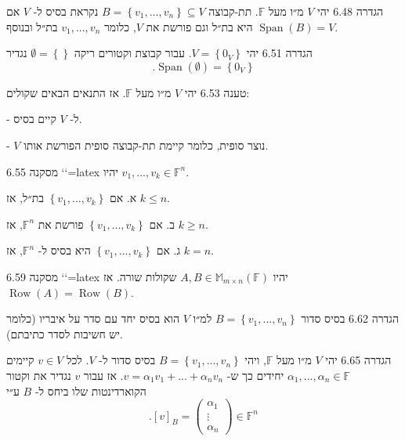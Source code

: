 \documentclass[a4paper, 11pt]{article}
\newcommand{\Set}[1]{\left\{#1\right\}}
\begin{document}
\begin{envbox}[defcolor]{הגדרה 6.48}
יהי $V$ מ״ו מעל $\mathbb{F}$. תת-קבוצה $B=\Set{v_1,...,v_n}\subseteq V$ נקראת בסיס ל- $V$ אם היא בת״ל וגם פורשת את $V$, כלומר $v_1,...,v_n$ בת״ל ובנוסף $\mathop{\mathrm{Span}}(B)=V$.
\end{envbox}

\begin{envbox}[defcolor]{הגדרה 6.51}
יהי $V=\Set{0_V}$. עבור קבוצת וקטורים ריקה $\emptyset=\Set{ }$ נגדיר 
\[
.\mathop{\mathrm{Span}}(\emptyset)=\Set{0_V}
\]
\end{envbox}

\begin{envbox}[thmcolor]{טענה 6.53}
יהי $V$ מ״ו מעל $\mathbb{F}$. אז התנאים הבאים שקולים:

-   ל- $V$ קיים בסיס.

-   $V$ נוצר סופית, כלומר קיימת תת-קבוצה סופית הפורשת אותו.
\end{envbox}

\begin{envbox}[thmcolor]{מסקנה 6.55}
`\label{cor:size-dim}`{=latex} יהיו $v_1,...,v_k\in\mathbb{F}^n$.

א. אם $\Set{v_1,...,v_k}$ בת״ל, אז $k\leq n$.

ב. אם $\Set{v_1,...,v_k}$ פורשת את $\mathbb{F}^n$, אז $k\geq n$.

ג. אם $\Set{v_1,...,v_k}$ היא בסיס ל- $\mathbb{F}^n$, אז $k=n$.
\end{envbox}

\begin{envbox}[thmcolor]{מסקנה 6.59}
`\label{cor:row-equivalence}`{=latex} יהיו $A,B\in\mathbb{M}_{m\times n}(\mathbb{F})$ שקולות שורה. אז $\mathop{\mathrm{Row}}(A)=\mathop{\mathrm{Row}}(B)$.
\end{envbox}

\begin{envbox}[defcolor]{הגדרה 6.62}
בסיס סדור $B=\Set{v_1,...,v_n}$ למ״ו $V$ הוא בסיס יחד עם סדר על איבריו (כלומר יש חשיבות לסדר כתיבתם).
\end{envbox}

\begin{envbox}[defcolor]{הגדרה 6.65}
יהי $V$ מ״ו מעל $\mathbb{F}$, ויהי $B=\Set{v_1,...,v_n}$ בסיס סדור ל- $V$. לכל $v\in V$ קיימים $\alpha_1,...,\alpha_n\in\mathbb{F}$ יחידים כך ש- $v=\alpha_1v_1+...+\alpha_nv_n$. אז עבור $v$ נגדיר את וקטור הקוארדינטות שלו ביחס ל- $B$ ע״י 
\[
.[v]_B=\begin{pmatrix}
\alpha_1 \\
\vdots \\
\alpha_n
\end{pmatrix}\in\mathbb{F}^n
\]
\end{envbox}
\end{document}
